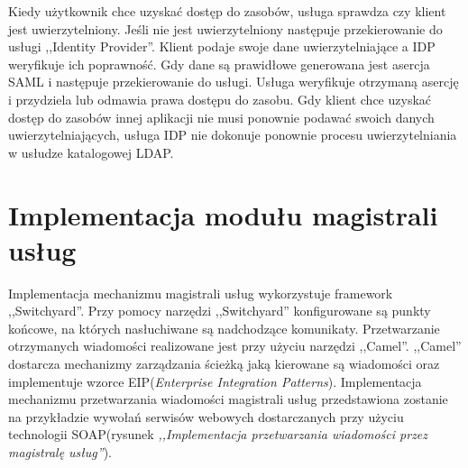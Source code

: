 	Kiedy użytkownik chce uzyskać dostęp do zasobów, usługa sprawdza czy klient jest uwierzytelniony. Jeśli nie jest uwierzytelniony następuje przekierowanie do usługi ,,Identity Provider''. Klient podaje swoje dane uwierzytelniające a IDP weryfikuje ich poprawność. Gdy dane są prawidłowe generowana jest asercja SAML i następuje przekierowanie do usługi. Usługa weryfikuje otrzymaną asercję i przydziela lub odmawia prawa dostępu do zasobu. Gdy klient chce uzyskać dostęp do zasobów innej aplikacji nie musi ponownie podawać swoich danych uwierzytelniających, usługa IDP nie dokonuje ponownie procesu uwierzytelniania w usłudze katalogowej LDAP.

\section{Implementacja modułu magistrali usług}

	Implementacja mechanizmu magistrali usług wykorzystuje framework ,,Switchyard''. Przy pomocy narzędzi ,,Switchyard'' konfigurowane są punkty końcowe, na których nasłuchiwane są nadchodzące komunikaty. Przetwarzanie otrzymanych wiadomości realizowane jest przy użyciu narzędzi ,,Camel''. ,,Camel'' dostarcza mechanizmy zarządzania ścieżką jaką kierowane są wiadomości  oraz implementuje wzorce EIP(\textit{Enterprise Integration Patterns}). Implementacja mechanizmu przetwarzania wiadomości magistrali usług przedstawiona zostanie na przykładzie wywołań serwisów webowych dostarczanych przy użyciu technologii SOAP(rysunek \textit{,,Implementacja przetwarzania wiadomości przez magistralę usług''}).

